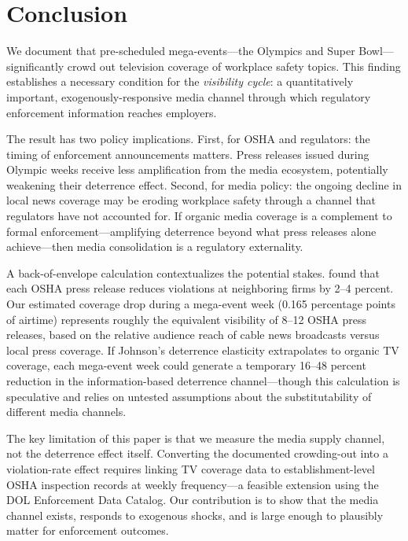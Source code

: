 \documentclass[12pt]{article}
\begin{document}
\section{Conclusion}\label{sec:conclusion}

We document that pre-scheduled mega-events---the Olympics and Super Bowl---significantly crowd out television coverage of workplace safety topics. This finding establishes a necessary condition for the \emph{visibility cycle}: a quantitatively important, exogenously-responsive media channel through which regulatory enforcement information reaches employers.

The result has two policy implications. First, for OSHA and regulators: the timing of enforcement announcements matters. Press releases issued during Olympic weeks receive less amplification from the media ecosystem, potentially weakening their deterrence effect. Second, for media policy: the ongoing decline in local news coverage may be eroding workplace safety through a channel that regulators have not accounted for. If organic media coverage is a complement to formal enforcement---amplifying deterrence beyond what press releases alone achieve---then media consolidation is a regulatory externality.

A back-of-envelope calculation contextualizes the potential stakes. \citet{Johnson2020} found that each OSHA press release reduces violations at neighboring firms by 2--4 percent. Our estimated coverage drop during a mega-event week (0.165 percentage points of airtime) represents roughly the equivalent visibility of 8--12 OSHA press releases, based on the relative audience reach of cable news broadcasts versus local press coverage. If Johnson's deterrence elasticity extrapolates to organic TV coverage, each mega-event week could generate a temporary 16--48 percent reduction in the information-based deterrence channel---though this calculation is speculative and relies on untested assumptions about the substitutability of different media channels.

The key limitation of this paper is that we measure the media supply channel, not the deterrence effect itself. Converting the documented crowding-out into a violation-rate effect requires linking TV coverage data to establishment-level OSHA inspection records at weekly frequency---a feasible extension using the DOL Enforcement Data Catalog. Our contribution is to show that the media channel exists, responds to exogenous shocks, and is large enough to plausibly matter for enforcement outcomes.
\end{document}
